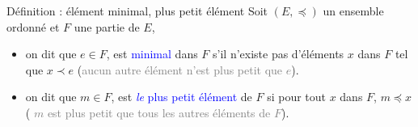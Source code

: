 \documentclass[10pt]{beamer}
\begin{document}
\begin{frame}[fragile]{\Ctitle}{\stitle}
	\begin{alertblock}{Définition : élément minimal, plus petit élément}
		Soit $(E,\preccurlyeq)$ un ensemble ordonné et $F$ une partie de $E$,
		\begin{itemize}
			\item<2-> on dit que $e \in F$, est \textcolor{blue}{minimal} dans $F$ s'il n'existe pas d'éléments $x$ dans $F$ tel que $x \prec e$ (\textcolor{gray}{aucun autre élément n'est plus petit que $e$}).
			\item<3-> on dit que $m \in F$, est \textcolor{blue}{\textit{le} plus petit élément} de $F$ si pour tout $x$ dans $F$, $m \preccurlyeq x$ (\textcolor{gray}{ $m$ est plus petit que tous les autres éléments de $F$}).
		\end{itemize}
	\end{alertblock}
	\onslide<5->{
		\begin{exampleblock}{Exercices}
			Etudier l'existence d'éléments minimaux et du plus petit élément dans les cas suivants :
			\begin{itemize}
				\item<6-> $E = (\N, \leqslant)$, et $F = \N$.
				\item<7-> $E = (\R, \leqslant)$ et $F = ]0; 1]$.
				\item<8-> $E = (\mathcal{P(E)}, \subset$) et $F = \mathcal{P(E)}\backslash \{\varnothing\}$ où $\mathcal{E} = \{a, b, c, d\}$.
			\end{itemize}
		\end{exampleblock}}
\end{frame}
\end{document}
